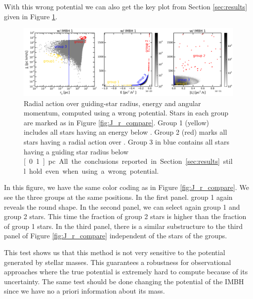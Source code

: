 \par With this wrong potential we can also get the key plot from Section \ref{sec:results} given in Figure \ref{fig:J_r_compare_wrong}.
\begin{figure}[htbp]
\centering
\includegraphics[width=\textwidth]{Plots/surface_density/J_r_compare_plot.png}
\caption{Radial action over guiding-star radius, energy and angular momentum, computed using a wrong potential. Stars in each group are marked as in Figure \ref{fig:J_r_compare}. Group 1 (yellow) includes all stars having an energy below . Group 2 (red) marks all stars having a radial action over . Group 3 in blue contains all stars having a guiding star radius below \unit[0.1]{pc}. All the conclusions reported in Section \ref{sec:results} still hold even when using a wrong potential.}
\label{fig:J_r_compare_wrong}
\end{figure}
In this figure, we have the same color coding as in Figure \ref{fig:J_r_compare}. We see the three groups at the same positions. In the first panel. group 1 again reveals the round shape. In the second panel, we can select again group 1 and group 2 stars. This time the fraction of group 2 stars is higher than the fraction of group 1 stars. In the third panel, there is a similar substructure to the third panel of Figure \ref{fig:J_r_compare} independent of the stars of the groups. 
\par This test shows us that this method is not very sensitive to the potential generated by stellar masses. This guarantees a robustness for observational approaches where the true potential is extremely hard to compute because of its uncertainty. The same test should be done changing the potential of the \ac{IMBH} since we have no a priori information about its mass.



